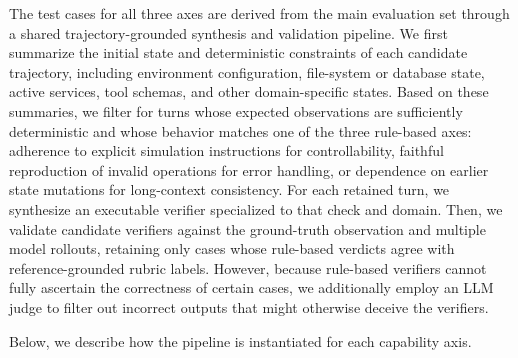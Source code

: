 The test cases for all three axes are derived from the main evaluation set through a shared trajectory-grounded synthesis and validation pipeline.
We first summarize the initial state and deterministic constraints of each candidate trajectory, including environment configuration, file-system or database state, active services, tool schemas, and other domain-specific states.
Based on these summaries, we filter for turns whose expected observations are sufficiently deterministic and whose behavior matches one of the three rule-based axes: adherence to explicit simulation instructions for controllability, faithful reproduction of invalid operations for error handling, or dependence on earlier state mutations for long-context consistency.
For each retained turn, we synthesize an executable verifier specialized to that check and domain.
Then, we validate candidate verifiers against the ground-truth observation and multiple model rollouts, retaining only cases whose rule-based verdicts agree with reference-grounded rubric labels.
However, because rule-based verifiers cannot fully ascertain the correctness of certain cases, we additionally employ an LLM judge to filter out incorrect outputs that might otherwise deceive the verifiers.

Below, we describe how the pipeline is instantiated for each capability axis.

